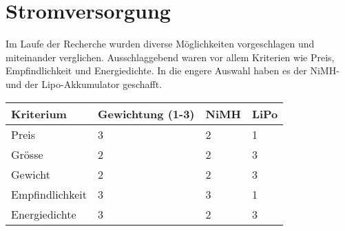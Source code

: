 \section{Stromversorgung}

Im Laufe der Recherche wurden diverse Möglichkeiten vorgeschlagen und miteinander verglichen. Ausschlaggebend waren vor allem Kriterien wie Preis, Empfindlichkeit und Energiedichte. In die engere Auswahl haben es der NiMH- und der Lipo-Akkumulator geschafft. 

\begin{table}[h]
\begin{tabular}{|p{4.5cm}|p{3.5cm}|p{2cm}|p{2cm}|}\hline
	
	\textbf{Kriterium}	& 	\textbf{Gewichtung (1-3)} & \textbf{NiMH} & \textbf{LiPo}\\\hline
	{Preis}	& 	{3} & {2} & {1}\\\hline
	{Grösse}	& 	{2} & {2} & {3}\\\hline
	{Gewicht}	& 	{2} & {2} & {3}\\\hline
	{Empfindlichkeit}	& 	{3} & {3} & {1}\\\hline
	{Energiedichte}	& 	{3} & {2} & {3}\\\hline

\end{tabular}\\
\end{table}